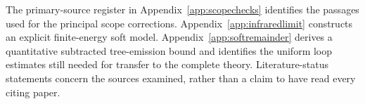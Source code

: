 The primary-source register in Appendix~\ref{app:scopechecks} identifies the passages used for the principal scope corrections. Appendix~\ref{app:infraredlimit} constructs an explicit finite-energy soft model. Appendix~\ref{app:softremainder} derives a quantitative subtracted tree-emission bound and identifies the uniform loop estimates still needed for transfer to the complete theory. Literature-status statements concern the sources examined, rather than a claim to have read every citing paper.
